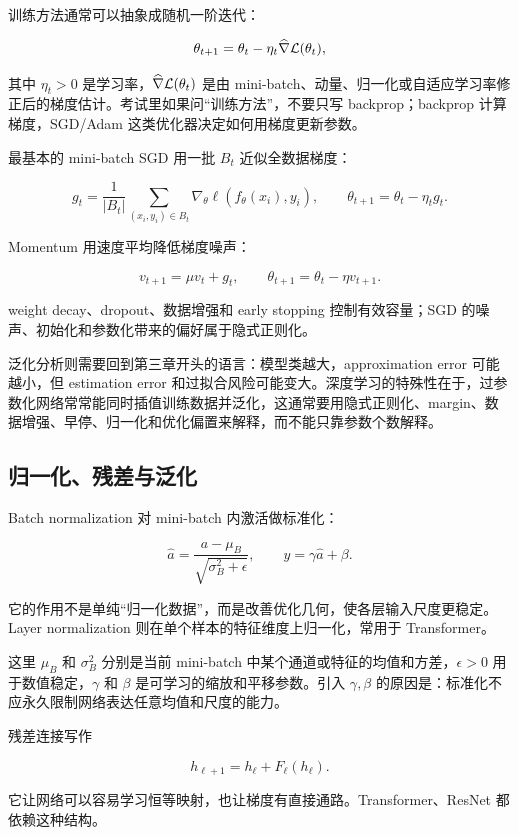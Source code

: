 训练方法通常可以抽象成随机一阶迭代：

\[
  \theta_{t+1}
  =
  \theta_t-\eta_t \widehat{\nabla}\mathcal{L}(\theta_t),
\]

其中 \(\eta_t>0\) 是学习率，\(\widehat{\nabla}\mathcal{L}(\theta_t)\) 是由 mini-batch、动量、归一化或自适应学习率修正后的梯度估计。考试里如果问“训练方法”，不要只写 backprop；backprop 计算梯度，SGD/Adam 这类优化器决定如何用梯度更新参数。

最基本的 mini-batch SGD 用一批 \(B_t\) 近似全数据梯度：

\[
  g_t=\frac{1}{|B_t|}\sum_{(x_i,y_i)\in B_t}\nabla_\theta\ell(f_\theta(x_i),y_i),
  \qquad
  \theta_{t+1}=\theta_t-\eta_t g_t.
\]

Momentum 用速度平均降低梯度噪声：

\[
  v_{t+1}=\mu v_t+g_t,
  \qquad
  \theta_{t+1}=\theta_t-\eta v_{t+1}.
\]

weight decay、dropout、数据增强和 early stopping 控制有效容量；SGD 的噪声、初始化和参数化带来的偏好属于隐式正则化。

泛化分析则需要回到第三章开头的语言：模型类越大，approximation error 可能越小，但 estimation error 和过拟合风险可能变大。深度学习的特殊性在于，过参数化网络常常能同时插值训练数据并泛化，这通常要用隐式正则化、margin、数据增强、早停、归一化和优化偏置来解释，而不能只靠参数个数解释。

\subsection{归一化、残差与泛化}

Batch normalization 对 mini-batch 内激活做标准化：

\[
  \widehat a
  =
  \frac{a-\mu_B}{\sqrt{\sigma_B^2+\epsilon}},
  \qquad
  y=\gamma \widehat a+\beta.
\]

它的作用不是单纯“归一化数据”，而是改善优化几何，使各层输入尺度更稳定。Layer normalization 则在单个样本的特征维度上归一化，常用于 Transformer。

这里 \(\mu_B\) 和 \(\sigma_B^2\) 分别是当前 mini-batch 中某个通道或特征的均值和方差，\(\epsilon>0\) 用于数值稳定，\(\gamma\) 和 \(\beta\) 是可学习的缩放和平移参数。引入 \(\gamma,\beta\) 的原因是：标准化不应永久限制网络表达任意均值和尺度的能力。

残差连接写作

\[
  h_{\ell+1}=h_\ell+F_\ell(h_\ell).
\]

它让网络可以容易学习恒等映射，也让梯度有直接通路。Transformer、ResNet 都依赖这种结构。

